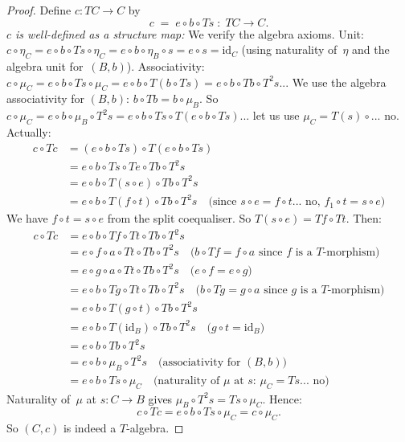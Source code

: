 \documentclass[a4paper,12pt]{book}
\newcommand{\id}{\mathrm{id}}
\theoremstyle{definition}
\theoremstyle{plain}
\theoremstyle{remark}
\begin{document}
\begin{proof}
Define $c\colon TC\to C$ by
\[
    c \;=\; e\circ b\circ Ts \;\colon\; TC\to C.
\]
\emph{$c$ is well-defined as a structure map:}
We verify the algebra axioms.  Unit: $c\circ\eta_C = e\circ b\circ Ts\circ\eta_C
= e\circ b\circ\eta_B\circ s = e\circ s = \id_C$
(using naturality of~$\eta$ and the algebra unit for~$(B,b)$).
Associativity: $c\circ\mu_C = e\circ b\circ Ts\circ\mu_C
= e\circ b\circ T(b\circ Ts) = e\circ b\circ Tb\circ T^2s$...
We use the algebra associativity for $(B,b)$: $b\circ Tb = b\circ\mu_B$.
So $c\circ\mu_C = e\circ b\circ\mu_B\circ T^2s = e\circ b\circ Ts\circ T(e\circ b\circ Ts)$...
let us use $\mu_C = T(s)\circ... $ no. Actually:
\begin{align*}
    c\circ Tc &= (e\circ b\circ Ts)\circ T(e\circ b\circ Ts) \\
    &= e\circ b\circ Ts\circ Te\circ Tb\circ T^2s \\
    &= e\circ b\circ T(s\circ e)\circ Tb\circ T^2s \\
    &= e\circ b\circ T(f\circ t)\circ Tb\circ T^2s
    \quad\text{(since $s\circ e = f\circ t$... no, $f_1\circ t = s\circ e$)}
\end{align*}
We have $f\circ t = s\circ e$ from the split coequaliser.
So $T(s\circ e) = Tf\circ Tt$.  Then:
\begin{align*}
    c\circ Tc &= e\circ b\circ Tf\circ Tt\circ Tb\circ T^2s \\
    &= e\circ f\circ a\circ Tt\circ Tb\circ T^2s
    \quad\text{($b\circ Tf = f\circ a$ since $f$ is a $T$-morphism)}\\
    &= e\circ g\circ a\circ Tt\circ Tb\circ T^2s
    \quad\text{($e\circ f = e\circ g$)}\\
    &= e\circ b\circ Tg\circ Tt\circ Tb\circ T^2s
    \quad\text{($b\circ Tg = g\circ a$ since $g$ is a $T$-morphism)}\\
    &= e\circ b\circ T(g\circ t)\circ Tb\circ T^2s \\
    &= e\circ b\circ T(\id_B)\circ Tb\circ T^2s
    \quad\text{($g\circ t = \id_B$)} \\
    &= e\circ b\circ Tb\circ T^2s \\
    &= e\circ b\circ\mu_B\circ T^2s
    \quad\text{(associativity for $(B,b)$)} \\
    &= e\circ b\circ Ts\circ\mu_C
    \quad\text{(naturality of $\mu$ at $s$: $\mu_C = Ts... $ no)}
\end{align*}
Naturality of~$\mu$ at $s\colon C\to B$ gives
$\mu_B\circ T^2s = Ts\circ\mu_C$.  Hence:
\[
    c\circ Tc = e\circ b\circ Ts\circ\mu_C = c\circ\mu_C.
\]
So $(C,c)$ is indeed a $T$-algebra.


\end{proof}
\end{document}
